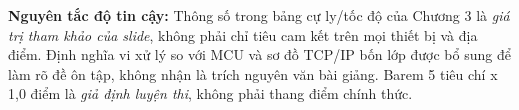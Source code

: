 \documentclass[12pt,a4paper]{article}
\begin{document}
\textbf{Nguyên tắc độ tin cậy:} Thông số trong bảng cự ly/tốc độ của Chương 3 là \emph{giá trị tham khảo của slide}, không phải chỉ tiêu cam kết trên mọi thiết bị và địa điểm. Định nghĩa vi xử lý so với MCU và sơ đồ TCP/IP bốn lớp được bổ sung để làm rõ đề ôn tập, không nhận là trích nguyên văn bài giảng. Barem 5 tiêu chí x 1,0 điểm là \emph{giả định luyện thi}, không phải thang điểm chính thức.
\end{document}
